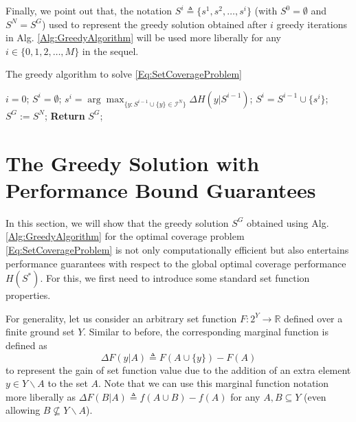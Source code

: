 \documentclass[letterpaper, 10 pt, conference]{ieeeconf}
\newcommand{\R}{\mathbb{R}}
\begin{document}
Finally, we point out that, the notation $S^i \triangleq \{s^1,s^2,\ldots,s^i\}$ (with $S^0=\emptyset$ and $S^N=S^G$) used to represent the greedy solution obtained after $i$ greedy iterations in Alg. \ref{Alg:GreedyAlgorithm} will be used more liberally for any $i\in\{0,1,2,\ldots,M\}$ in the sequel. 



\begin{algorithm}[!h]
\caption{The greedy algorithm to solve \eqref{Eq:SetCoverageProblem}}\label{Alg:GreedyAlgorithm}
\begin{algorithmic}[1]
\State $i=0$; $S^i = \emptyset$;  
    \State $s^{i} = \arg \max_{\{y:S^{i-1} \cup \{y\} \in \mathcal{I}^N\}} \Delta H(y \vert S^{i-1})$; 
    \State $S^{i} = S^{i-1} \cup \{s^{i}\}$; 
\EndFor
\State $S^G := S^N$;  \textbf{Return} $S^G$;
\end{algorithmic}
\end{algorithm}




\section{The Greedy Solution with Performance Bound Guarantees}
\label{Sec:Preliminaries}


In this section, we will show that the greedy solution $S^G$ obtained using Alg. \ref{Alg:GreedyAlgorithm} for the optimal coverage problem \eqref{Eq:SetCoverageProblem} is not only computationally efficient but also entertains performance guarantees with respect to the global optimal coverage performance $H(S^*)$. For this, we first need to introduce some standard set function properties.

For generality, let us consider an arbitrary set function $F:2^Y \rightarrow \R$ defined over a finite ground set $Y$. Similar to before, the corresponding marginal function is defined as 
\begin{equation}
    \Delta F(y \vert A) \triangleq F(A\cup\{y\}) - F(A)
\end{equation}
to represent the gain of set function value due to the addition of an extra element $y \in Y \backslash A$ to the set $A$. Note that we can use this marginal function notation more liberally as $\Delta F(B \vert A) \triangleq f(A\cup B) - f(A)$ for any $A, B \subseteq Y$ (even allowing $B \not\subseteq Y\backslash A$).  
\end{document}
